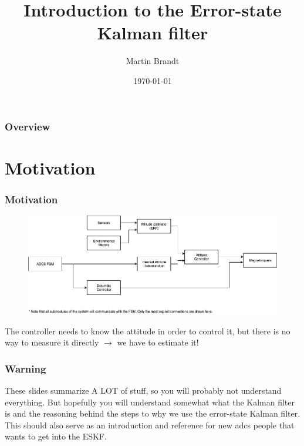 \documentclass{beamer}
\title[ESKF Introduction]{Introduction to the Error-state Kalman filter} %
\author{Martin Brandt} %
\date{\today} %
\begin{document}
\begin{frame}
\titlepage %
\end{frame}

\begin{frame}
\frametitle{Overview} %
\tableofcontents %
\end{frame}

\section{Motivation}

\begin{frame}
    \frametitle{Motivation}
    \begin{figure}
    \includegraphics[width=0.8\linewidth]{adcs.png}
    \end{figure}
    The controller needs to know the attitude in order to control it, but there is no way to measure it directly $\rightarrow$ we have to estimate it!
\end{frame}


\begin{frame}
    \frametitle{Warning}
    These slides summarize A LOT of stuff, so you will probably not understand everything. But hopefully you will understand somewhat what the Kalman filter is and the reasoning behind the steps to why we use the error-state Kalman filter. This should also serve as an introduction and reference for new adcs people that wants to get into the ESKF. 
\end{frame}
\end{document}
